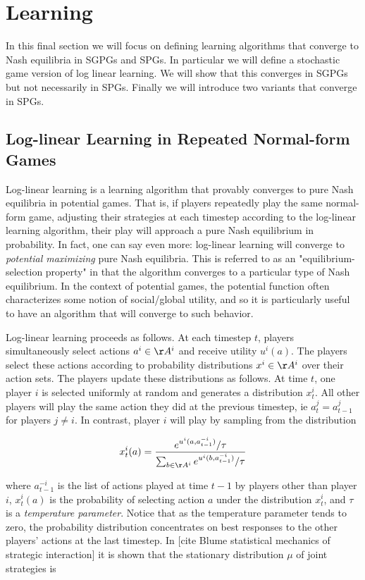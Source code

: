 
\section{Learning}

In this final section we will focus on defining learning algorithms that converge to Nash equilibria in SGPGs and SPGs. In particular we will define a stochastic game version of log linear learning. We will show that this converges in SGPGs but not necessarily in SPGs. Finally we will introduce two variants that converge in SPGs.

\subsection{Log-linear Learning in Repeated Normal-form Games}

Log-linear learning is a learning algorithm that provably converges to pure Nash equilibria in potential games. That is, if players repeatedly play the same normal-form game, adjusting their strategies at each timestep according to the log-linear learning algorithm, their play will approach a pure Nash equilibrium in probability. In fact, one can say even more: log-linear learning will converge to {\em potential maximizing} pure Nash equilibria. This is referred to as an "equilibrium-selection property" in that the algorithm converges to a particular type of Nash equilibrium. In the context of potential games, the potential function often characterizes some notion of social/global utility, and so it is particularly useful to have an algorithm that will converge to such behavior.

Log-linear learning proceeds as follows. At each timestep $t$, players simultaneously select actions $a^i \in \AA^i$ and receive utility $u^i(a)$. The players select these actions according to probability distributions $x^i \in \AA^i$ over their action sets. The players update these distributions as follows. At time $t$, one player $i$ is selected uniformly at random and generates a distribution $x^i_t$. All other players will play the same action they did at the previous timestep, ie $a_{t}^{j} = a_{t-1}^{j}$ for players $j \neq i$. In contrast, player $i$ will play by sampling from the distribution

$$
x^i_t(a) = \dfrac{e^{u^i(a, a_{t-1}^{-i})}/\tau}{\sum_{b \in \AA^i} e^{u^i(b, a_{t-1}^{-i})}/\tau}
$$

where $a_{t-1}^{-i}$ is the list of actions played at time $t-1$ by players other than player $i$, $x^i_t(a)$ is the probability of selecting action $a$ under the distribution $x^i_t$, and $\tau$ is a {\em temperature parameter}. Notice that as the temperature parameter tends to zero, the probability distribution concentrates on best responses to the other players' actions at the last timestep. In [cite Blume statistical mechanics of strategic interaction] it is shown that the stationary distribution $\mu$ of joint strategies is

